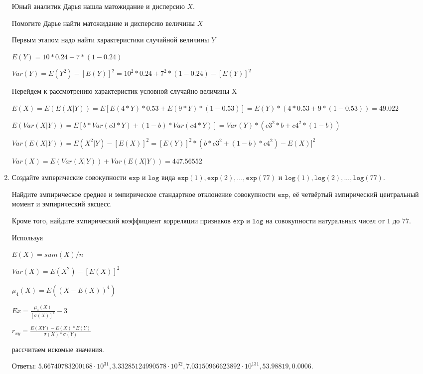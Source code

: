 \documentclass[a4paper,12pt]{article}
\begin{document}
\begin{enumerate}
	Юный аналитик Дарья нашла матожидание и дисперсию $X$.

	Помогите Дарье найти матожидание и дисперсию величины $X$
	


	

	Первым этапом надо найти характеристики случайной величины $Y$

	$E(Y) = 10 * 0.24 + 7 * (1 - 0.24)$

	$Var(Y) = E(Y^2) - [E(Y)]^2 = 10^2 * 0.24 + 7^2 * (1 - 0.24) - [E(Y)]^2$


	Перейдем к рассмотрению характеристик условной случайно величины X

	$E(X) = E(E(X|Y)) = E[E(4 * Y) * 0.53 + E(9 * Y) * (1 - 0.53)] = E(Y) * (4 * 0.53 + 9 * (1 - 0.53)) = 49.022$

	$E(Var(X|Y)) = E[b * Var(c3 * Y) + (1 - b) * Var(c4 * Y)] = Var(Y) * (c3^2 * b + c4^2 * (1- b)) $

	$Var(E(X|Y)) = E(X^2|Y) - [E(X)]^2 = [E(Y)]^2 * (b * c3^2 + (1-b)*c4^2) - E(X)]^2$

	$Var(X) = E(Var(X|Y)) + Var(E(X|Y)) = 447.56552$
	

\item

    
    Создайте эмперические совокупности  $\mathtt{\text{exp}}$ и $\mathtt{\text{log}}$ вида $\mathtt{\text{exp}}(1),\mathtt{\text{exp}}(2), ..., \mathtt{\text{exp}}(77) $ и $\mathtt{\text{log}}(1),\mathtt{\text{log}}(2), ..., \mathtt{\text{log}}(77). $

    Найдите эмпирическое среднее и эмпирическое стандартное отклонение совокупности $\mathtt{\text{exp}}$, её четвёртый эмпирический центральный момент и эмпирический эксцесс.

    Кроме того, найдите эмпирический коэффициент корреляции признаков $\mathtt{\text{exp}}$ и $\mathtt{\text{log}}$ на совокупности натуральных чисел от $1$ до $77$.
    


    
    Используя

	$E(X) = sum(X) / n$

	$Var(X) = E(X^2) - [E(X)]^2$

	$\mu_4(X) = E((X-E(X))^4)$

	$Ex = \frac{\mu_4(X)}{[\sigma(X)]^4} - 3$

	$r_{xy} = \frac{E(XY) - E(X) * E(Y)}{\sigma(X) * \sigma(Y)}$

    рассчитаем искомые значения.

    Ответы: $5.66740783200168 \cdot 10^{31}, 3.33285124990578 \cdot 10^{32}, 7.03150966623892 \cdot 10^{131}, 53.98819, 0.0006$.


\end{enumerate}
\end{document}
